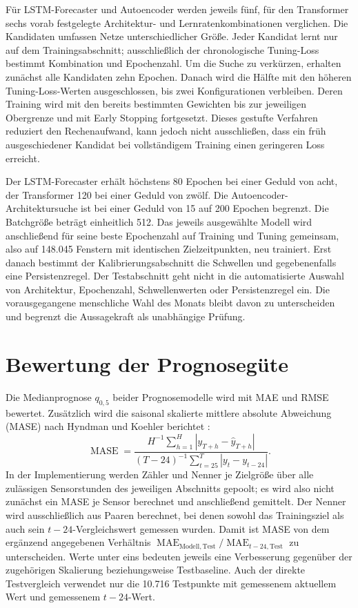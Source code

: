 Für LSTM-Forecaster und Autoencoder werden jeweils fünf, für den Transformer
sechs vorab festgelegte Architektur- und Lernratenkombinationen verglichen.
Die Kandidaten umfassen Netze unterschiedlicher Größe. Jeder
Kandidat lernt nur auf dem Trainingsabschnitt; ausschließlich der
chronologische Tuning-Loss bestimmt Kombination und Epochenzahl. Um die Suche
zu verkürzen, erhalten zunächst alle Kandidaten zehn Epochen. Danach wird die
Hälfte mit den höheren Tuning-Loss-Werten ausgeschlossen, bis zwei
Konfigurationen verbleiben. Deren Training wird mit den bereits bestimmten
Gewichten bis zur jeweiligen Obergrenze und mit Early Stopping fortgesetzt.
Dieses gestufte Verfahren reduziert den Rechenaufwand, kann jedoch nicht
ausschließen, dass ein früh ausgeschiedener Kandidat bei vollständigem
Training einen geringeren Loss erreicht.

Der LSTM-Forecaster erhält höchstens 80 Epochen bei einer Geduld von acht, der
Transformer 120 bei einer Geduld von zwölf. Die Autoencoder-Architektursuche
ist bei einer Geduld von 15 auf 200 Epochen begrenzt. Die Batchgröße beträgt
einheitlich 512. Das jeweils ausgewählte Modell wird anschließend für seine
beste Epochenzahl auf Training und Tuning
gemeinsam, also auf 148.045 Fenstern mit identischen Zielzeitpunkten, neu
trainiert. Erst danach bestimmt der Kalibrierungsabschnitt die Schwellen und
gegebenenfalls eine Persistenzregel. Der Testabschnitt geht nicht in die
automatisierte Auswahl von Architektur, Epochenzahl, Schwellenwerten oder
Persistenzregel ein. Die vorausgegangene menschliche Wahl des Monats bleibt
davon zu unterscheiden und begrenzt die Aussagekraft als unabhängige Prüfung.

\section{Bewertung der Prognosegüte}

Die Medianprognose $q_{0{,}5}$ beider Prognosemodelle wird mit MAE und RMSE
bewertet. Zusätzlich wird
die saisonal skalierte mittlere absolute Abweichung (MASE) nach Hyndman und
Koehler berichtet \cite{hyndman2006accuracy}:
\begin{equation}
 \operatorname{MASE}=
 \frac{H^{-1}\sum_{h=1}^{H}|y_{T+h}-\hat{y}_{T+h}|}
 {(T-24)^{-1}\sum_{t=25}^{T}|y_t-y_{t-24}|}.
\end{equation}
In der Implementierung werden Zähler und Nenner je Zielgröße über alle
zulässigen Sensorstunden des jeweiligen Abschnitts gepoolt; es wird also nicht
zunächst ein MASE je Sensor berechnet und anschließend gemittelt. Der Nenner
wird ausschließlich aus Paaren berechnet, bei denen sowohl das Trainingsziel
als auch sein $t-24$-Vergleichswert gemessen wurden. Damit ist MASE von dem
ergänzend angegebenen Verhältnis
$\operatorname{MAE}_{\mathrm{Modell,Test}}/
\operatorname{MAE}_{t-24,\mathrm{Test}}$ zu unterscheiden. Werte unter eins
bedeuten jeweils eine Verbesserung gegenüber der zugehörigen Skalierung
beziehungsweise Testbaseline. Auch der direkte Testvergleich verwendet nur
die 10.716 Testpunkte mit gemessenem aktuellem Wert und gemessenem $t-24$-Wert.

